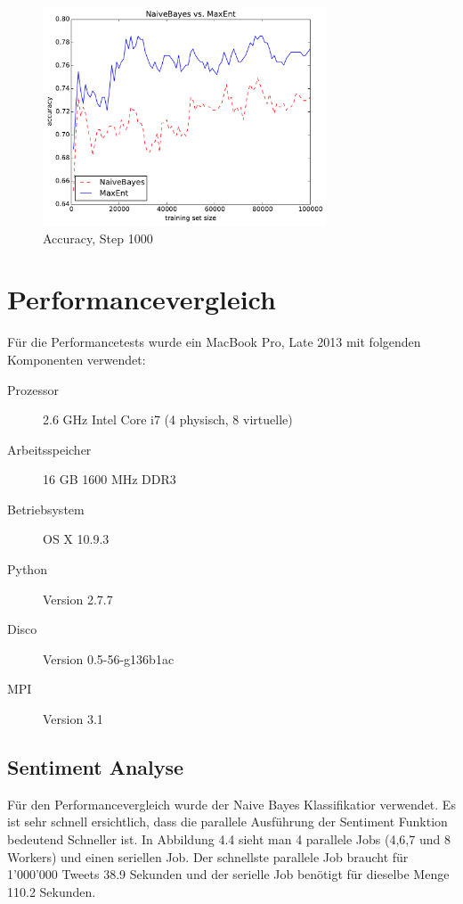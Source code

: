 \documentclass[12pt, oneside]{report}   	%
\begin{document}
\begin{figure}[htbp]
\begin{center}
\includegraphics[width=0.75\textwidth]{bilder/cmp_nb_vs_me_S1000_M100000.pdf}
\caption{Accuracy, Step 1000}
\label{img:acc3}
\end{center}
\end{figure}


\section{Performancevergleich}
Für die Performancetests wurde ein MacBook Pro, Late 2013 mit folgenden Komponenten verwendet:
\begin{description}
\item[ Prozessor] 2.6 GHz Intel Core i7 (4 physisch, 8 virtuelle)
\item[ Arbeitsspeicher] 16 GB 1600 MHz DDR3
\item[ Betriebsystem] OS X 10.9.3
\item[ Python] Version 2.7.7
\item[ Disco ] Version 0.5-56-g136b1ac
\item[ MPI ] Version 3.1
\end{description}

\subsection{Sentiment Analyse}
Für den Performancevergleich wurde der Naive Bayes  Klassifikatior verwendet. Es ist sehr schnell ersichtlich, dass die parallele Ausführung der Sentiment Funktion bedeutend Schneller ist. In Abbildung 4.4 sieht man 4 parallele Jobs (4,6,7 und 8 Workers) und einen seriellen Job. Der schnellste parallele Job braucht für 1'000'000 Tweets 38.9 Sekunden und der serielle Job benötigt für dieselbe Menge 110.2 Sekunden. 
\end{document}
